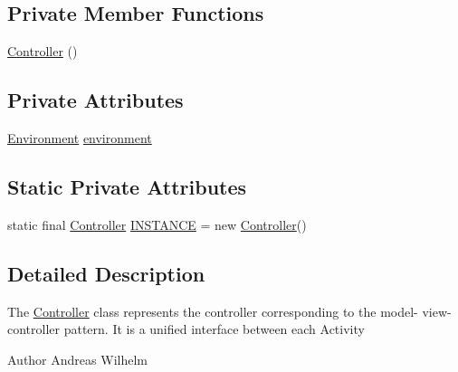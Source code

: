 \subsection*{Private Member Functions}
\begin{DoxyCompactItemize}
\item 
\hyperlink{classsep_1_1conquest_1_1controller_1_1_controller_a791a0edf03308edca225bfa2123b332f}{Controller} ()
\end{DoxyCompactItemize}
\subsection*{Private Attributes}
\begin{DoxyCompactItemize}
\item 
\hyperlink{classsep_1_1conquest_1_1model_1_1_environment}{Environment} \hyperlink{classsep_1_1conquest_1_1controller_1_1_controller_a48d74d24fbf9e9e607d22cc967a25236}{environment}
\end{DoxyCompactItemize}
\subsection*{Static Private Attributes}
\begin{DoxyCompactItemize}
\item 
static final \hyperlink{classsep_1_1conquest_1_1controller_1_1_controller}{Controller} \hyperlink{classsep_1_1conquest_1_1controller_1_1_controller_a6ff9a1e3ccbc0bbe56f0702506e2bb63}{INSTANCE} = new \hyperlink{classsep_1_1conquest_1_1controller_1_1_controller}{Controller}()
\end{DoxyCompactItemize}


\subsection{Detailed Description}
The \hyperlink{classsep_1_1conquest_1_1controller_1_1_controller}{Controller} class represents the controller corresponding to the model-\/ view-\/controller pattern. It is a unified interface between each {\ttfamily Activity}

{\ttfamily  \begin{DoxyAuthor}{Author}
Andreas Wilhelm 
\end{DoxyAuthor}
}

